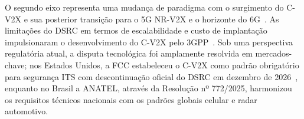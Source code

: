 O segundo eixo representa uma mudança de paradigma com o surgimento do \gls{C-V2X} e sua posterior transição para o \gls{5G} \gls{NR}-\gls{V2X} e o horizonte do \gls{6G}~\cite{rodriguez2025_6genabled}. As limitações do \gls{DSRC} em termos de escalabilidade e custo de implantação impulsionaram o desenvolvimento do \gls{C-V2X} pelo \gls{3GPP}~\cite{chen2017}. Sob uma perspectiva regulatória atual, a disputa tecnológica foi amplamente resolvida em mercados-chave; nos Estados Unidos, a \gls{FCC} estabeleceu o \gls{C-V2X} como padrão obrigatório para segurança \gls{ITS} com descontinuação oficial do \gls{DSRC} em dezembro de 2026~\cite{fcc2024_59ghz}, enquanto no Brasil a \gls{ANATEL}, através da Resolução nº 772/2025, harmonizou os requisitos técnicos nacionais com os padrões globais celular e radar automotivo. 





